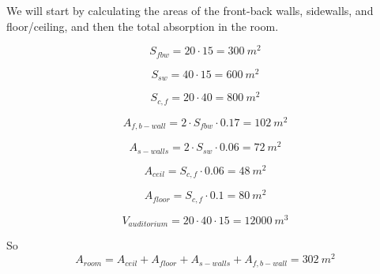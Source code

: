 \documentclass{article}
\begin{document}
We will start by calculating the areas of the front-back walls, sidewalls, and floor/ceiling, and then the total absorption in the room.

\begin{equation}
    S_{fbw}=20 \cdot 15 = 300 \ m^2
\end{equation}

\begin{equation}
    S_{sw}=40 \cdot 15 = 600 \ m^2
\end{equation}

\begin{equation}
    S_{c,f}=20 \cdot 40 = 800 \ m^2
\end{equation}

\begin{equation}
    A_{f,b-wall} = 2 \cdot S_{fbw} \cdot 0.17 = 102\ m^2
\end{equation}

\begin{equation}
    A_{s-walls} = 2 \cdot S_{sw} \cdot 0.06 = 72\ m^2
\end{equation}

\begin{equation}
    A_{ceil} = S_{c,f} \cdot 0.06 = 48\ m^2
\end{equation}

\begin{equation}
    A_{floor} = S_{c,f} \cdot 0.1 = 80\ m^2
\end{equation}

\begin{equation}
    V_{auditorium} = 20 \cdot 40 \cdot 15 = 12000 \ m^3
\end{equation}

So
\begin{equation}
    A_{room} = A_{ceil}+A_{floor}+A_{s-walls}+A_{f,b-wall} = 302\ m^2
\end{equation}
\end{document}
